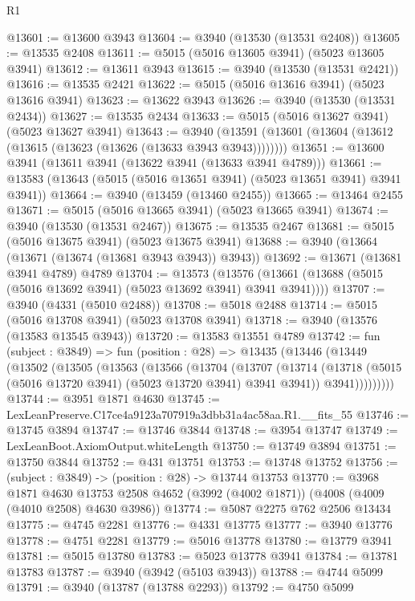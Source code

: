 \begin{lexlean}{R1}
\begin{coremodule}
@13601 := @13600 @3943
@13604 := @3940 (@13530 (@13531 @2408))
@13605 := @13535 @2408
@13611 := @5015 (@5016 @13605 @3941) (@5023 @13605 @3941)
@13612 := @13611 @3943
@13615 := @3940 (@13530 (@13531 @2421))
@13616 := @13535 @2421
@13622 := @5015 (@5016 @13616 @3941) (@5023 @13616 @3941)
@13623 := @13622 @3943
@13626 := @3940 (@13530 (@13531 @2434))
@13627 := @13535 @2434
@13633 := @5015 (@5016 @13627 @3941) (@5023 @13627 @3941)
@13643 := @3940 (@13591 (@13601 (@13604 (@13612 (@13615 (@13623 (@13626 (@13633 @3943 @3943))))))))
@13651 := @13600 @3941 (@13611 @3941 (@13622 @3941 (@13633 @3941 @4789)))
@13661 := @13583 (@13643 (@5015 (@5016 @13651 @3941) (@5023 @13651 @3941) @3941 @3941))
@13664 := @3940 (@13459 (@13460 @2455))
@13665 := @13464 @2455
@13671 := @5015 (@5016 @13665 @3941) (@5023 @13665 @3941)
@13674 := @3940 (@13530 (@13531 @2467))
@13675 := @13535 @2467
@13681 := @5015 (@5016 @13675 @3941) (@5023 @13675 @3941)
@13688 := @3940 (@13664 (@13671 (@13674 (@13681 @3943 @3943)) @3943))
@13692 := @13671 (@13681 @3941 @4789) @4789
@13704 := @13573
    (@13576 (@13661 (@13688 (@5015 (@5016 @13692 @3941) (@5023 @13692 @3941) @3941 @3941))))
@13707 := @3940 (@4331 (@5010 @2488))
@13708 := @5018 @2488
@13714 := @5015 (@5016 @13708 @3941) (@5023 @13708 @3941)
@13718 := @3940 (@13576 (@13583 @13545 @3943))
@13720 := @13583 @13551 @4789
@13742 := fun (subject : @3849) =>
  fun (position : @28) =>
  @13435
    (@13446
      (@13449
        (@13502
          (@13505
            (@13563
              (@13566
                (@13704
                  (@13707
                    (@13714
                      (@13718 (@5015 (@5016 @13720 @3941) (@5023 @13720 @3941) @3941 @3941))
                      @3941)))))))))
@13744 := @3951 @1871 @4630
@13745 := LexLeanPreserve.C17ce4a9123a707919a3dbb31a4ac58aa.R1.__fits_55
@13746 := @13745 @3894
@13747 := @13746 @3844
@13748 := @3954 @13747
@13749 := LexLeanBoot.AxiomOutput.whiteLength
@13750 := @13749 @3894
@13751 := @13750 @3844
@13752 := @431 @13751
@13753 := @13748 @13752
@13756 := (subject : @3849) -> (position : @28) -> @13744 @13753
@13770 := @3968
    @1871
    @4630
    @13753
    @2508
    @4652
    (@3992 (@4002 @1871))
    (@4008 (@4009 (@4010 @2508) @4630 @3986))
@13774 := @5087 @2275 @762 @2506 @13434
@13775 := @4745 @2281
@13776 := @4331 @13775
@13777 := @3940 @13776
@13778 := @4751 @2281
@13779 := @5016 @13778
@13780 := @13779 @3941
@13781 := @5015 @13780
@13783 := @5023 @13778 @3941
@13784 := @13781 @13783
@13787 := @3940 (@3942 (@5103 @3943))
@13788 := @4744 @5099
@13791 := @3940 (@13787 (@13788 @2293))
@13792 := @4750 @5099

\end{coremodule}
\end{lexlean}
